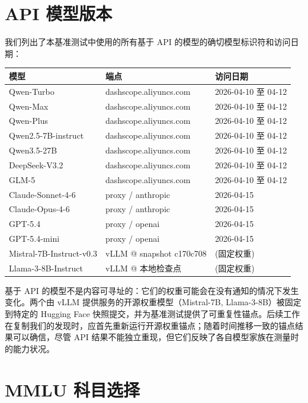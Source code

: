 \documentclass[11pt,a4paper,fontset=fandol]{ctexart}
\begin{document}
\section{API 模型版本}
\label{app:api_versions}

我们列出了本基准测试中使用的所有基于 API 的模型的确切模型标识符和访问日期：

\begin{center}
\small
\begin{tabular}{lll}
\toprule
\textbf{模型} & \textbf{端点} & \textbf{访问日期} \\
\midrule
Qwen-Turbo       & dashscope.aliyuncs.com & 2026-04-10 至 04-12 \\
Qwen-Max         & dashscope.aliyuncs.com & 2026-04-10 至 04-12 \\
Qwen-Plus        & dashscope.aliyuncs.com & 2026-04-10 至 04-12 \\
Qwen2.5-7B-instruct & dashscope.aliyuncs.com & 2026-04-10 至 04-12 \\
Qwen3.5-27B      & dashscope.aliyuncs.com & 2026-04-10 至 04-12 \\
DeepSeek-V3.2    & dashscope.aliyuncs.com & 2026-04-10 至 04-12 \\
GLM-5            & dashscope.aliyuncs.com & 2026-04-10 至 04-12 \\
Claude-Sonnet-4-6 & proxy / anthropic     & 2026-04-15 \\
Claude-Opus-4-6  & proxy / anthropic      & 2026-04-15 \\
GPT-5.4          & proxy / openai         & 2026-04-15 \\
GPT-5.4-mini     & proxy / openai         & 2026-04-15 \\
\midrule
Mistral-7B-Instruct-v0.3 & vLLM @ snapshot c170c708 & (固定权重) \\
Llama-3-8B-Instruct & vLLM @ 本地检查点 & (固定权重) \\
\bottomrule
\end{tabular}
\end{center}

基于 API 的模型不是内容可寻址的：它们的权重可能会在没有通知的情况下发生变化。两个由 vLLM 提供服务的开源权重模型（Mistral-7B, Llama-3-8B）被固定到特定的 Hugging Face 快照提交，并为基准测试提供了可重复性锚点。后续工作在复制我们的发现时，应首先重新运行开源权重锚点；随着时间推移一致的锚点结果可以确信，尽管 API 结果不能独立重现，但它们反映了各自模型家族在测量时的能力状况。

\section{MMLU 科目选择}
\label{app:subjects}
\end{document}

